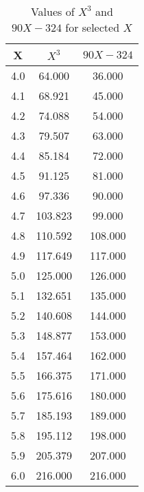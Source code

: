 ﻿%
\begin{table}[h!]
    \centering
    \caption{Values of $X^3$ and $90X - 324$ for selected $X$}
    \begin{tabular}{|c|c|c|}
        \hline
        \textbf{X} & \textbf{$X^3$} & \textbf{$90X - 324$} \\ \hline
        4.0        & 64.000         & 36.000               \\ \hline
        4.1        & 68.921         & 45.000               \\ \hline
        4.2        & 74.088         & 54.000               \\ \hline
        4.3        & 79.507         & 63.000               \\ \hline
        4.4        & 85.184         & 72.000               \\ \hline
        4.5        & 91.125         & 81.000               \\ \hline
        4.6        & 97.336         & 90.000               \\ \hline
        4.7        & 103.823        & 99.000               \\ \hline
        4.8        & 110.592        & 108.000              \\ \hline
        4.9        & 117.649        & 117.000              \\ \hline
        5.0        & 125.000        & 126.000              \\ \hline
        5.1        & 132.651        & 135.000              \\ \hline
        5.2        & 140.608        & 144.000              \\ \hline
        5.3        & 148.877        & 153.000              \\ \hline
        5.4        & 157.464        & 162.000              \\ \hline
        5.5        & 166.375        & 171.000              \\ \hline
        5.6        & 175.616        & 180.000              \\ \hline
        5.7        & 185.193        & 189.000              \\ \hline
        5.8        & 195.112        & 198.000              \\ \hline
        5.9        & 205.379        & 207.000              \\ \hline
        6.0        & 216.000        & 216.000              \\ \hline

\end{tabular}
\end{table}
